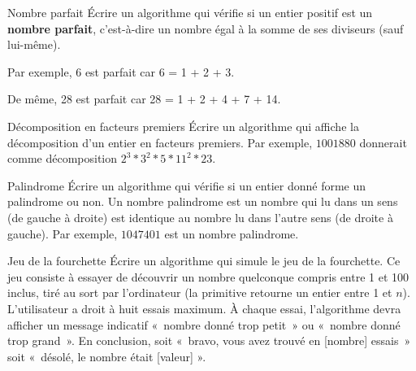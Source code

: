 \begin{Exercice}{Nombre parfait}
	Écrire un algorithme qui vérifie si un entier positif est un
	\textbf{nombre parfait}, c’est-à-dire un nombre égal à la somme de ses
	diviseurs (sauf lui-même). 
	
	Par exemple, 6 est parfait car 6 = 1 + 2 + 3. 
	
	De même, 28 est parfait car 28 = 1 + 2 + 4 + 7 + 14.
\end{Exercice}

\begin{Exercice}{Décomposition en facteurs premiers}
	Écrire un algorithme qui affiche la décomposition 
	d’un entier en facteurs premiers. 
	Par exemple, $1001880$ donnerait comme décomposition
	$2^3 * 3^2 * 5 * 11^2 * 23$.
\end{Exercice}

\begin{Exercice}{Palindrome}
	Écrire un algorithme qui vérifie si un entier donné 
	forme un palindrome ou non. 
	Un nombre palindrome est un nombre qui lu dans un sens 
	(de gauche à droite) est identique au nombre lu dans l’autre sens 
	(de droite à gauche). 
	Par exemple, $1047401$ est un nombre palindrome.
\end{Exercice}

\begin{Exercice}{Jeu de la fourchette}
	Écrire un algorithme qui simule le jeu de la
	fourchette. Ce jeu consiste à essayer de découvrir un nombre quelconque
	compris entre 1 et 100 inclus, tiré au sort par l’ordinateur (la primitive
	 retourne un entier entre 1 et $n$). 
	L’utilisateur a droit à huit essais
	maximum. À chaque essai, l’algorithme devra afficher un message
	indicatif «~nombre donné trop petit~» ou «~nombre donné trop grand~».
	En conclusion, soit «~bravo, vous avez trouvé en [nombre] essais~» soit
	«~désolé, le nombre était [valeur] ».
\end{Exercice}

